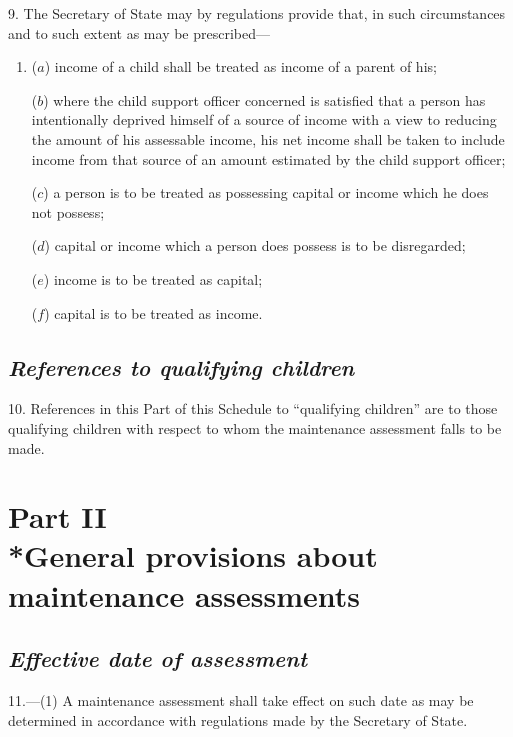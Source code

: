 \documentclass[12pt,a4paper]{article}
\begin{document}
9. The Secretary of State may by regulations provide that, in such circumstances and to such extent as may be prescribed—
\begin{enumerate}\item[]
($a$) income of a child shall be treated as income of a parent of his;

($b$) where the child support officer concerned is satisfied that a person has intentionally deprived himself of a source of income with a view to reducing the amount of his assessable income, his net income shall be taken to include income from that source of an amount estimated by the child support officer;

($c$) a person is to be treated as possessing capital or income which he does not possess;

($d$) capital or income which a person does possess is to be disregarded;

($e$) income is to be treated as capital;

($f$) capital is to be treated as income.
\end{enumerate}

\subsection*{\itshape References to qualifying children}

10. References in this Part of this Schedule to “qualifying children” are to those qualifying children with respect to whom the maintenance assessment falls to be made.


\section[Part II --- General provisions about maintenance assessments]{Part II\\*General provisions about maintenance assessments}

\renewcommand\parthead{--- Schedule 1 Part II}

\subsection*{\itshape Effective date of assessment}

11.---(1) A maintenance assessment shall take effect on such date as may be determined in accordance with regulations made by the Secretary of State.
\end{document}
